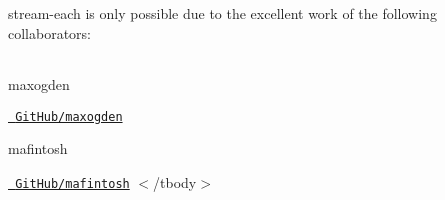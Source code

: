 stream-\/each is only possible due to the excellent work of the following collaborators\+:

\tabulinesep=1mm
\begin{longtabu}spread 0pt [c]{*{0}{|X[-1]}|}
\hline
\end{longtabu}


maxogden

\href{https://github.com/maxogden}{\texttt{ Git\+Hub/maxogden}} 

mafintosh

\href{https://github.com/mafintosh}{\texttt{ Git\+Hub/mafintosh}} $<$/tbody$>$